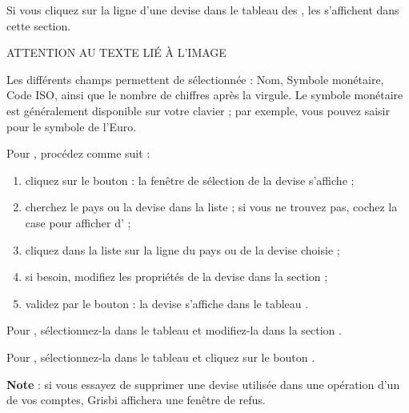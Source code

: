 Si vous cliquez sur la ligne d'une devise dans le tableau des , les  s'affichent dans cette section.

ATTENTION AU TEXTE LIÉ À L'IMAGE


Les différents champs permettent de  sélectionnée : Nom, Symbole monétaire, Code ISO, ainsi que le nombre de chiffres après la virgule. Le symbole monétaire est généralement disponible sur votre clavier ; par exemple, vous pouvez saisir  pour le symbole de l'Euro.


\ifIllustration
\else
\fi
Pour , procédez comme suit :

\begin{enumerate}
	\item cliquez sur le bouton  : la fenêtre de sélection de la devise s'affiche ;
	\item cherchez le pays ou la devise dans la liste ; si vous ne trouvez pas, cochez la case  pour afficher d' ;
	\item cliquez dans la liste sur la ligne du pays ou de la devise choisie ;
	\item  si besoin, modifiez les propriétés de la devise dans la section  ;
	\item validez par le bouton  : la devise s'affiche dans le tableau .
\end{enumerate}

Pour , sélectionnez-la dans le tableau  et modifiez-la dans la section .

Pour , sélectionnez-la dans le tableau  et cliquez sur le bouton .

\textbf{Note} : si vous essayez de supprimer une devise utilisée dans une opération d'un de vos comptes, Grisbi affichera une fenêtre de refus.


